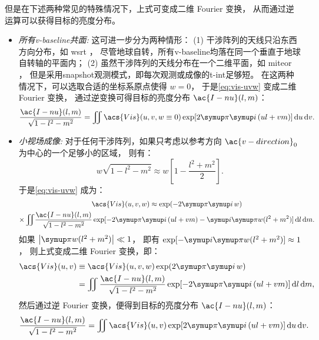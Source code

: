 但是在下述两种常见的特殊情况下，上式可变成二维 Fourier 变换，
从而通过逆运算可以获得目标的亮度分布。
\begin{itemize}
\item
\emph{所有\acl{v-baseline}共面:}
这可进一步分为两种情形：
(1) 干涉阵列的天线只沿东西方向分布，如 \ac{wsrt} \cite{hogbom1974wsrt}，
尽管地球自转，所有\acl{v-baseline}均落在同一个垂直于地球自转轴的平面内；
(2) 虽然干涉阵列的天线分布在一个二维平面，如 \ac{miteor} \cite{zheng2014}，
但是采用\ac{snapshot}观测模式，即每次观测或成像的\ac{t-int}足够短。
在这两种情况下，可以选取合适的坐标系原点使得 $w = 0$，
于是\autoref{eq:vis-uvw} 变成二维 Fourier 变换，
通过逆变换可得目标的亮度分布 $\ac{I-nu}(l,m)$：
\begin{equation}
  \label{eq:vis-inv1}
  \frac{\ac{I-nu}(l,m)}{\sqrt{1-l^2-m^2}}
    = \iint \acs{Vis}(u,v, w \equiv 0)
      \exp [2\Cpi\Ci\, (ul+vm)] \,\D{u}\,\D{v} .
\end{equation}

\item
\emph{小视场成像:}
对于任何干涉阵列，如果只考虑以参考方向 $\ac{v-direction}_0$ 为中心的一个足够小的区域，
则有：
\begin{equation}
  w \sqrt{1-l^2-m^2}
    \approx w \left[ 1 - \frac{l^2+m^2}{2} \right] .
\end{equation}
于是\autoref{eq:vis-uvw} 成为：
\begin{multline}
  \acs{Vis}(u,v,w) \approx \exp (-2\Cpi\Ci\,w) \\
    \times \iint\! \frac{\ac{I-nu}(l,m)}{\sqrt{1-l^2-m^2}}
    \exp [-2\Cpi\Ci\, (ul+vm) -\Ci\Cpi w(l^2+m^2)] \,\D{l}\,\D{m} .
\end{multline}
如果 $\big| \Cpi w(l^2+m^2) \big| \ll 1$，
即有 $\exp [-\Ci\Cpi w(l^2+m^2)] \approx 1$，
则上式变成二维 Fourier 变换，即：
\begin{align}
  \acs{Vis}(u,v)
    & \equiv \acs{Vis}(u,v,w) \exp (2\Cpi\Ci\,w)  \\
    & = \iint \frac{\ac{I-nu}(l,m)}{\sqrt{1-l^2-m^2}}
    \exp [-2\Cpi\Ci\, (ul+vm)] \,\D{l}\,\D{m} ,
  \label{eq:vis-uv}
\end{align}
然后通过逆 Fourier 变换，便得到目标的亮度分布 $\ac{I-nu}(l,m)$：
\begin{equation}
  \label{eq:vis-inv2}
  \frac{\ac{I-nu}(l,m)}{\sqrt{1-l^2-m^2}}
    = \iint \acs{Vis}(u,v)
      \exp [2\Cpi\Ci\, (ul+vm)] \,\D{u}\,\D{v} .
\end{equation}

\end{itemize}

